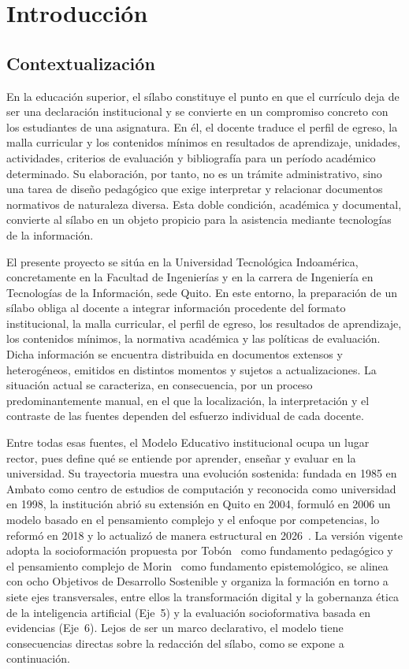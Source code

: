 \chapter{Introducción}
\label{chap:introduccion}

\section{Contextualización}
En la educación superior, el sílabo constituye el punto en que el currículo deja de ser una declaración institucional y se convierte en un compromiso concreto con los estudiantes de una asignatura. En él, el docente traduce el perfil de egreso, la malla curricular y los contenidos mínimos en resultados de aprendizaje, unidades, actividades, criterios de evaluación y bibliografía para un período académico determinado. Su elaboración, por tanto, no es un trámite administrativo, sino una tarea de diseño pedagógico que exige interpretar y relacionar documentos normativos de naturaleza diversa. Esta doble condición, académica y documental, convierte al sílabo en un objeto propicio para la asistencia mediante tecnologías de la información.

El presente proyecto se sitúa en la Universidad Tecnológica Indoamérica, concretamente en la Facultad de Ingenierías y en la carrera de Ingeniería en Tecnologías de la Información, sede Quito. En este entorno, la preparación de un sílabo obliga al docente a integrar información procedente del formato institucional, la malla curricular, el perfil de egreso, los resultados de aprendizaje, los contenidos mínimos, la normativa académica y las políticas de evaluación. Dicha información se encuentra distribuida en documentos extensos y heterogéneos, emitidos en distintos momentos y sujetos a actualizaciones. La situación actual se caracteriza, en consecuencia, por un proceso predominantemente manual, en el que la localización, la interpretación y el contraste de las fuentes dependen del esfuerzo individual de cada docente.

Entre todas esas fuentes, el Modelo Educativo institucional ocupa un lugar rector, pues define qué se entiende por aprender, enseñar y evaluar en la universidad. Su trayectoria muestra una evolución sostenida: fundada en 1985 en Ambato como centro de estudios de computación y reconocida como universidad en 1998, la institución abrió su extensión en Quito en 2004, formuló en 2006 un modelo basado en el pensamiento complejo y el enfoque por competencias, lo reformó en 2018 y lo actualizó de manera estructural en 2026~\cite{uti2026modelo}. La versión vigente adopta la socioformación propuesta por Tobón~\cite{tobon2013} como fundamento pedagógico y el pensamiento complejo de Morin~\cite{morin1999} como fundamento epistemológico, se alinea con ocho Objetivos de Desarrollo Sostenible y organiza la formación en torno a siete ejes transversales, entre ellos la transformación digital y la gobernanza ética de la inteligencia artificial (Eje~5) y la evaluación socioformativa basada en evidencias (Eje~6). Lejos de ser un marco declarativo, el modelo tiene consecuencias directas sobre la redacción del sílabo, como se expone a continuación.

